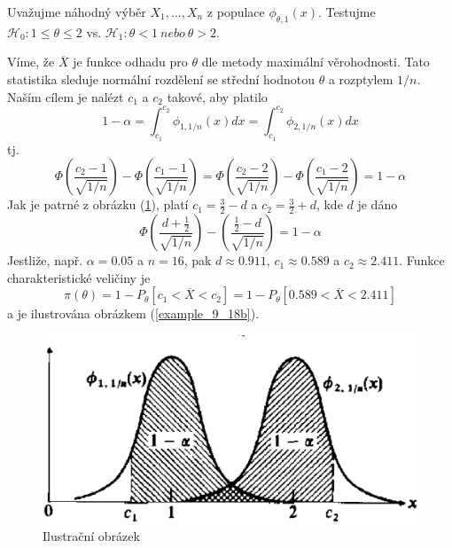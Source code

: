 \begin{example}
Uvažujme náhodný výběr $X_1, ..., X_n$ z populace $\phi_{\theta, 1}(x)$. Testujme $\mathscr{H}_0: 1 \le \theta \le 2$ vs. $\mathscr{H}_1: \theta < 1 ~ \textit{nebo} ~ \theta > 2$.

Víme, že $\overline{X}$ je funkce odhadu pro $\theta$ dle metody maximální věrohodnosti. Tato statistika sleduje normální rozdělení se střední hodnotou $\theta$ a rozptylem $1/n$. Naším cílem je nalézt $c_1$ a $c_2$ takové, aby platilo
\begin{equation*}
1 - \alpha = \int_{c_1}^{c_2} \phi_{1, 1/n}(x)dx = \int_{c_1}^{c_2} \phi_{2, 1/n}(x)dx
\end{equation*}
tj.
\begin{equation*}
\Phi\left(\frac{c_2 - 1}{\sqrt{1/n}}\right) - \Phi\left(\frac{c_1 - 1}{\sqrt{1/n}}\right) = \Phi\left(\frac{c_2 - 2}{\sqrt{1/n}}\right) - \Phi\left(\frac{c_1 - 2}{\sqrt{1/n}}\right) = 1 - \alpha
\end{equation*}
Jak je patrné z obrázku (\ref{example_9_18a}), platí $c_1 = \frac{3}{2} - d$ a $c_2 = \frac{3}{2} + d$, kde $d$ je dáno
\begin{equation*}
\Phi \left(\frac{d + \frac{1}{2}}{\sqrt{1/n}}\right) - \left(\frac{\frac{1}{2} - d}{\sqrt{1/n}}\right) = 1 - \alpha
\end{equation*}
Jestliže, např. $\alpha = 0.05$ a $n = 16$, pak $d \approx 0.911$, $c_1 \approx 0.589$ a $c_2 \approx 2.411$. Funkce charakteristické veličiny je
\begin{equation*}
\pi(\theta) = 1 - P_{\theta}[c_1 < \overline{X} < c_2] = 1 - P_{\theta}[0.589 < \overline{X} < 2.411]
\end{equation*}
a je ilustrována obrázkem  (\ref{example_9_18b}).
\end{example}

\begin{figure}[htp]
\centering
\includegraphics[scale = 0.5]{pictures/example_9_18a.eps}
\caption{Ilustrační obrázek}
\label{example_9_18a}
\end{figure}

